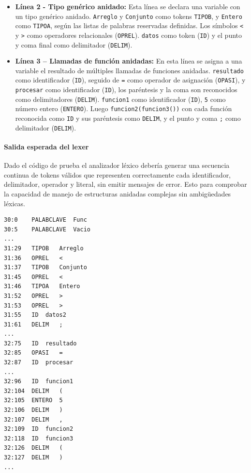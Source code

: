 \documentclass{article}
\begin{document}
\begin{itemize}
  \item \textbf{Línea 2 - Tipo genérico anidado:} 
    Esta línea se declara una variable con un tipo genérico anidado.  \lstinline{Arreglo} y \lstinline{Conjunto} como tokens \lstinline{TIPOB}, y \lstinline{Entero} como \lstinline{TIPOA}, según las listas de palabras reservadas definidas.
    Los símbolos \lstinline{<} y \lstinline{>}  como operadores relacionales (\lstinline{OPREL}).
    \lstinline{datos} como token (\lstinline{ID}) y el punto y coma final como delimitador (\lstinline{DELIM}).
    
  \item \textbf{Línea 3 – Llamadas de función anidadas:} 
    En esta línea se asigna a una variable el resultado de múltiples llamadas de funciones anidadas.
    \lstinline{resultado} como identificador (\lstinline{ID}), seguido de \lstinline{=} como operador de asignación (\lstinline{OPASI}), y \lstinline{procesar} como identificador (\lstinline{ID}), los paréntesis y la coma son reconocidos como delimitadores (\lstinline{DELIM}). 
    \lstinline{funcion1} como identificador (\lstinline{ID}), \lstinline{5} como número entero (\lstinline{ENTERO}). 
    Luego \lstinline{funcion2(funcion3())} con cada función reconocida como \lstinline{ID} y sus paréntesis como \lstinline{DELIM}, y el punto y coma \lstinline{;} como delimitador (\lstinline{DELIM}).

\end{itemize}

\paragraph{Salida esperada del lexer}

Dado el código de prueba el analizador léxico debería generar una secuencia continua de tokens válidos que representen correctamente cada identificador, delimitador, operador y literal, sin emitir mensajes de error. Esto para comprobar la capacidad de manejo de estructuras anidadas complejas sin ambigüedades léxicas.

\begin{verbatim}
30:0	PALABCLAVE	Func
30:5	PALABCLAVE	Vacio
...
31:29	TIPOB	Arreglo
31:36	OPREL	<
31:37	TIPOB	Conjunto
31:45	OPREL	<
31:46	TIPOA	Entero
31:52	OPREL	>
31:53	OPREL	>
31:55	ID	datos2
31:61	DELIM	;
...
32:75	ID	resultado
32:85	OPASI	=
32:87	ID	procesar
...
32:96	ID	funcion1
32:104	DELIM	(
32:105	ENTERO	5
32:106	DELIM	)
32:107	DELIM	,
32:109	ID	funcion2
32:118	ID	funcion3
32:126	DELIM	(
32:127	DELIM	)
...
\end{verbatim}
\end{document}
